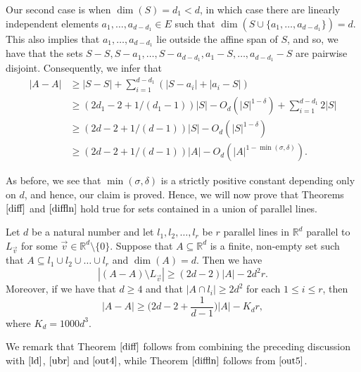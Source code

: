 Our second case is when $\dim(S) = d_1 < d$, in which case there are linearly independent elements $a_1, \dots, a_{d-d_1} \in E$ such that $\dim(S \cup \{a_1, \dots, a_{d-d_1} \}) = d$. This also implies that $a_1, \dots, a_{d-d_1}$ lie outside the affine span of $S$, and so, we have that the sets $S - S, S- a_1, \dots, S-a_{d-d_1}, a_1 - S, \dots, a_{d-d_1} - S$ are pairwise disjoint. Consequently, we infer that
\begin{align*}
 |A-A|  &  \geq |S-S| + \sum_{i=1}^{d-d_1} (|S- a_i| + |a_i - S|) \\
 & \geq (2d_1-2  + 1/({d_1-1}))|S|  - O_d(|S|^{1- \delta})  + \sum_{i=1}^{d-d_1} 2|S|\\
 & \geq (2d - 2 +  1/({d -1})) |S| - O_d(|S|^{1-\delta}) \\
 & \geq (2d-2 +  1/({d -1}))|A| -  O_d(|A|^{1- \min{(\sigma, \delta)}}).
\end{align*}
\par
As before, we see that $\min{(\sigma, \delta)}$ is a strictly positive constant depending only on $d$, and hence, our claim is proved. Hence, we will now prove that Theorems $\ref{diff}$ and $\ref{diffln}$ hold true for sets contained in a union of parallel lines.

\begin{Proposition} \label{3lines}
Let $d$ be a natural number and let $l_1, l_2, \dots, l_r$ be $r$ parallel lines in $\mathbb{R}^d$ parallel to $L_{\vec{v}}$ for some $\vec{v} \in \mathbb{R}^d \setminus \{0\}$. Suppose that $A \subseteq \mathbb{R}^d$ is a finite, non-empty set such that $A \subseteq l_1 \cup l_2 \cup \dots \cup l_r$ and $\dim(A) = d$. Then we have
\begin{equation} \label{out5}
 |(A-A) \setminus L_{\vec{v}}| \geq (2d-2)|A| - 2d^2 r.
 \end{equation}
Moreover, if we have that $d \geq 4$ and that $|A \cap l_i| \geq 2d^2$ for each $1 \leq i \leq r$, then
\begin{equation} \label{out4}
|A-A| \geq \bigg(2d-2 + \frac{1}{d-1}\bigg)|A| - K_d r,
 \end{equation}
where $K_d = 1000d^3$.
\end{Proposition}

We remark that Theorem $\ref{diff}$ follows from combining the preceding discussion with $\eqref{ld}$, $\eqref{ubr}$ and $\eqref{out4}$, while Theorem $\ref{diffln}$ follows from $\eqref{out5}$.
\par

